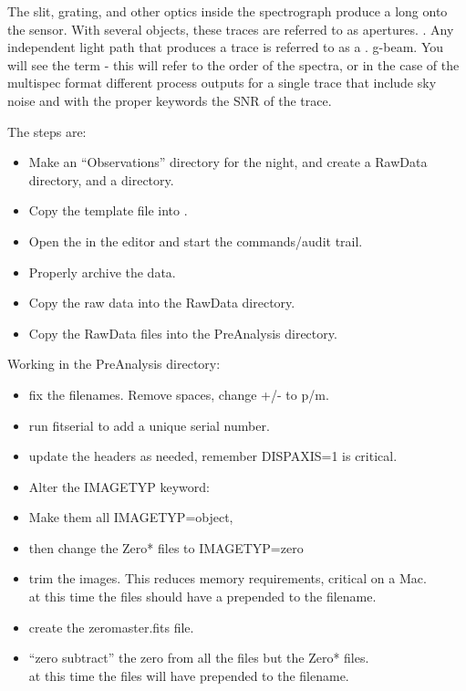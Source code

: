 The slit, grating, and other optics inside the spectrograph produce a long
  onto the sensor. With several objects, these traces are referred to
as apertures. . Any independent light path that produces a trace
is referred to as a .   \gls{g-beam}.
You will see the term  - this will refer to the order of the spectra, or in
the case of the multispec format different process outputs for a single trace that include
sky noise and with the proper keywords the SNR of the trace.

The steps are:


\begin{itemize}
\addtolength{\itemsep}{-0.5\baselineskip}
   \item   Make an ``Observations'' directory for the night, and create a RawData directory, and
a  directory.
   \item   Copy the template  file into . 
   \item   Open the  in the editor and start the commands/audit trail.
   \item   Properly archive the data.
   \item   Copy the raw data into the RawData directory.
   \item   Copy the RawData files into the PreAnalysis directory.\end{itemize}



Working in the PreAnalysis directory:

\begin{itemize}
\addtolength{\itemsep}{-0.5\baselineskip}
   \item   fix the filenames. Remove spaces, change +/- to p/m.
   \item   run fitserial to add a unique serial number.
   \item   update the headers as needed, remember DISPAXIS=1 is critical.
   \item   Alter the IMAGETYP keyword:
   \item   Make them all IMAGETYP=object,
   \item   then change the Zero* files to IMAGETYP=zero
   \item   trim the images. This reduces memory requirements, critical on a Mac.\\
  at this time the files should have a  prepended to the filename.
   \item   create the zeromaster.fits file.
   \item   ``zero subtract'' the zero from all the files but the Zero* files.\\
  at this time the files will have  prepended to the filename.\end{itemize}



